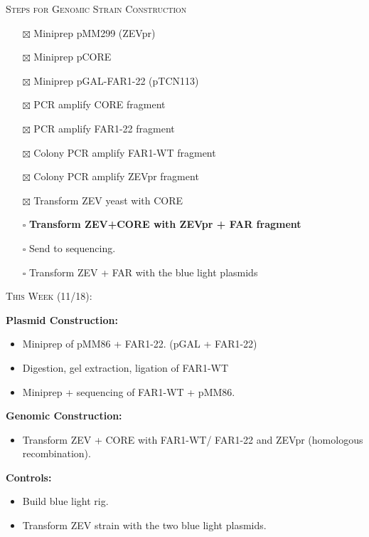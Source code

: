 \documentclass{beamer}
\begin{document}
\begin{frame}
    \begin{center}
        {\large \textsc{Steps for Genomic Strain Construction}}
    \end{center}
        \begin{itemize}
            \item[$\boxtimes$]  Miniprep pMM299 (ZEVpr)
            \item[$\boxtimes$]  Miniprep pCORE
            \item[$\boxtimes$]  Miniprep pGAL-FAR1-22 (pTCN113)
            \item[$\boxtimes$]  PCR amplify CORE fragment
            \item[$\boxtimes$]  PCR amplify FAR1-22 fragment
            \item[$\boxtimes$]  Colony PCR amplify FAR1-WT fragment
            \item[$\boxtimes$]  Colony PCR amplify ZEVpr fragment
            \item[$\boxtimes$]  Transform ZEV yeast with CORE
            \item[$\square$] \textbf{Transform ZEV+CORE with ZEVpr + FAR fragment}
            \item[$\square$] Send to sequencing.
            \item[$\square$] Transform ZEV + FAR with the blue light plasmids
        \end{itemize}
\end{frame}

\begin{frame}
    \begin{center}
        {\large \textsc{This Week (11/18):}}
    \end{center}

    \textbf{Plasmid Construction:}
    \begin{itemize}
        \item Miniprep of pMM86 + FAR1-22. (pGAL + FAR1-22)\\
        \item Digestion, gel extraction, ligation of FAR1-WT\\
        \item Miniprep + sequencing of FAR1-WT + pMM86.\\
    \end{itemize}
    \textbf{Genomic Construction:}
    \begin{itemize}
        \item Transform ZEV + CORE with FAR1-WT/ FAR1-22 and ZEVpr (homologous recombination).
    \end{itemize}
    \textbf{Controls:}
    \begin{itemize}
        \item Build blue light rig.
        \item Transform ZEV strain with the two blue light plasmids.
    \end{itemize}
    
\end{frame}

\end{document}
